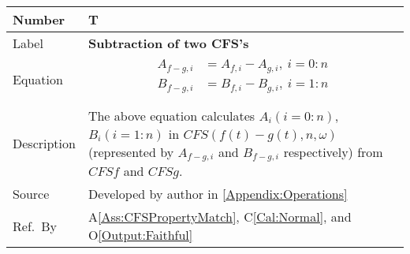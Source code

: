 \documentclass[12pt]{article}
\newcommand{\colAwidth}{0.13\textwidth}
\newcommand{\colBwidth}{0.82\textwidth}
\newcounter{theorynum} %
\newcommand{\aref}[1]{A\ref{#1}}
\newcommand{\calref}[1]{C\ref{#1}}
\newcommand{\oref}[1]{O\ref{#1}}
\begin{document}
\begin{minipage}{\textwidth}
	\renewcommand*{\arraystretch}{1.5}
	\begin{tabular}{| p{\colAwidth} | p{\colBwidth}|}
		\hline
		\rowcolor[gray]{0.9}
		Number& T{theorynum}\thetheorynum \label{T:Subtraction}\\
		\hline
		Label&\bf Subtraction of two CFS's\\
		\hline
		Equation&  
		\begin{equation}
		\begin{aligned}
		A_{f-g, i}
		&=A_{f, i} - A_{g, i},~i=0:n\\
		B_{f-g, i}
		&=B_{f, i} - B_{g, i},~i=1:n\\
		\end{aligned}
		\end{equation}\\
		\hline
		Description & The above equation calculates $A_i(i=0:n)$, $B_i(i=1:n)$ in $\mathit{CFS}(f(t)-g(t), n, \omega)$ (represented by $A_{f-g, i}$ and $B_{f-g, i}$ respectively) from $\mathit{CFSf}$ and $\mathit{CFSg}$.\\
		
		\hline
		Source & Developed by author in \autoref{Appendix:Operations}\\
		\hline
		Ref.\ By & \aref{Ass:CFSPropertyMatch}, \calref{Cal:Normal}, and \oref{Output:Faithful}\\
		\hline
	\end{tabular}
\end{minipage}\\

~\newline
\end{document}
